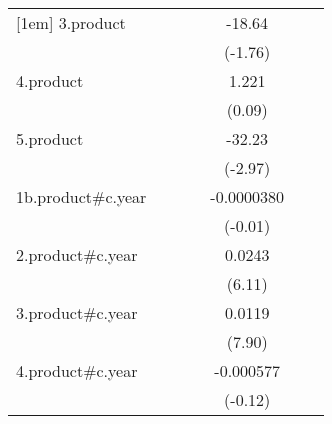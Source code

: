 {\begin{tabular}{l*{6}{c}}
[1em]
3.product           &                     &                     &                     &      -18.64         &                     &                     \\
                    &                     &                     &                     &     (-1.76)         &                     &                     \\
[1em]
4.product           &                     &                     &                     &       1.221         &                     &                     \\
                    &                     &                     &                     &      (0.09)         &                     &                     \\
[1em]
5.product           &                     &                     &                     &      -32.23\sym{**} &                     &                     \\
                    &                     &                     &                     &     (-2.97)         &                     &                     \\
[1em]
1b.product#c.year   &                     &                     &                     &  -0.0000380         &                     &                     \\
                    &                     &                     &                     &     (-0.01)         &                     &                     \\
[1em]
2.product#c.year    &                     &                     &                     &      0.0243\sym{***}&                     &                     \\
                    &                     &                     &                     &      (6.11)         &                     &                     \\
[1em]
3.product#c.year    &                     &                     &                     &      0.0119\sym{***}&                     &                     \\
                    &                     &                     &                     &      (7.90)         &                     &                     \\
[1em]
4.product#c.year    &                     &                     &                     &   -0.000577         &                     &                     \\
                    &                     &                     &                     &     (-0.12)         &                     &                     \\

\end{tabular}}
